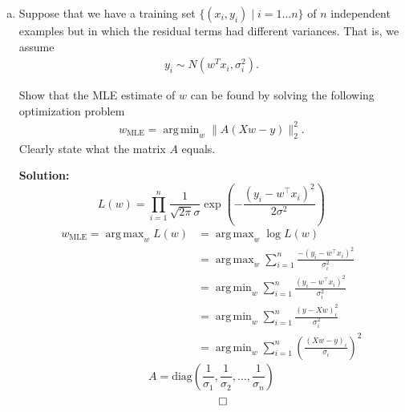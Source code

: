 \documentclass{article}
\DeclareMathOperator*{\argmax}{arg\,max}
\DeclareMathOperator*{\argmin}{arg\,min}
\newenvironment{solution}{\color{blue} \smallskip \textbf{Solution:}}{}
\begin{document}
\begin{enumerate}[(a)]
\begin{solution}
\begin{enumerate}[(i)]
            $\displaystyle \Sigma^* = \text{diag}\left(\frac{(x_{i1} - \mu_1)^2}{n}, \frac{(x_{i2} - \mu_2)^2}{n}, \dots \right)$.
            \item
            $\displaystyle \hat{\mu} = \frac{1}{n}\sum_{i=1}^n x_{i}, \hat{\Sigma}^* = \text{diag}\left(\frac{(x_{i1} - \hat{\mu}_1)^2}{n}, \frac{(x_{i2} - \hat{\mu}_2)^2}{n}, \dots \right)$.
            
            \[ \qedhere \]

        \end{enumerate}
    \end{solution}

    \newpage
    \item %
    Suppose that we have a training set $\{(x_{i}, y_{i}) \mid i = 1 \ldots n\}$ of $n$ independent examples but in which the residual terms had different variances. That is, we assume
    \begin{align*}
        y_{i} \sim N(w^{T}x_{i}, \sigma_{i}^{2}).
    \end{align*}
    
    Show that the MLE estimate of $w$ can be found by solving the following optimization problem
    \begin{align*}
        w_{\text{MLE}} = \argmin_{w} \|A(Xw - y)\|_{2}^{2}.
    \end{align*}
    Clearly state what the matrix $A$ equals.
    
    \begin{solution}
        $$
        L(w) = \prod_{i=1}^n \frac{1}{\sqrt{2\pi}\sigma}
        \exp(-\frac{(y_i - w^\top x_i)^2}{2\sigma^2})
        $$
        \begin{align*}
            w_{\text{MLE}}=\argmax_{w} L(w) &= \argmax_{w} \log L(w)
            \\
            &= \argmax_{w} \sum_{i=1}^n \frac{-(y_i - w^\top x_i)^2}{\sigma_i^2} \\
            &= \argmin_{w} \sum_{i=1}^n \frac{(y_i - w^\top x_i)^2}{\sigma_i^2} \\
            &= \argmin_{w} \sum_{i=1}^n \frac{(y - Xw)_i^2}{\sigma_i^2} \\
            &= \argmin_{w} \sum_{i=1}^n \left(\frac{(Xw - y)_i}{\sigma_i}\right)^2
        \end{align*}
        $$
        A = \text{diag}(\frac{1}{\sigma_1},\frac{1}{\sigma_2}, \dots, \frac{1}{\sigma_n})
        $$
        \[ \qedhere \]
    \end{solution}


\end{enumerate}
\end{document}
